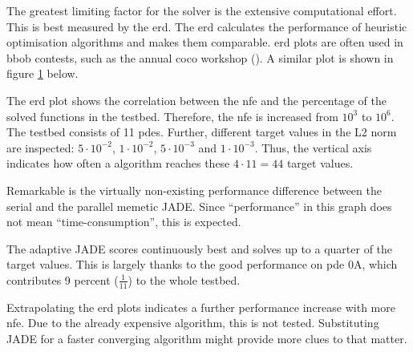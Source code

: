 \documentclass[./\jobname.tex]{subfiles}
\begin{document}
The greatest limiting factor for the solver is the extensive computational effort. This is best measured by the \gls{erd}. The \gls{erd} calculates the performance of heuristic optimisation algorithms and makes them comparable. \gls{erd} plots are often used in \gls{bbob} contests, such as the annual \gls{coco} workshop (\cite{nikolaus_hansen_2019_2594848}). A similar plot is shown in figure \ref{fig:ert_plot} below. 

The \gls{erd} plot shows the correlation between the \gls{nfe} and the percentage of the solved functions in the testbed. Therefore, the \gls{nfe} is increased from $10^3$ to $10^6$. The testbed consists of 11 \gls{pde}s. Further, different target values in the L2 norm are inspected: $5\cdot 10^{-2}$, $1\cdot 10^{-2}$, $5\cdot 10^{-3}$ and $1\cdot 10^{-3}$. Thus, the vertical axis indicates how often a algorithm reaches these $4 \cdot 11 = 44$ target values. 

\begin{figure}[H]
	\centering
	\noindent{}
	\label{fig:ert_plot}
\end{figure}

Remarkable is the virtually non-existing performance difference between the serial and the parallel memetic JADE. Since ``performance'' in this graph does not mean ``time-consumption'', this is expected.

The adaptive JADE scores continuously best and solves up to a quarter of the target values. This is largely thanks to the good performance on \gls{pde} 0A, which contributes 9 percent ($\frac{1}{11}$) to the whole testbed.  

Extrapolating the \gls{erd} plots indicates a further performance increase with more \gls{nfe}. Due to the already expensive algorithm, this is not tested. Substituting JADE for a faster converging algorithm might provide more clues to that matter. 
\end{document}
